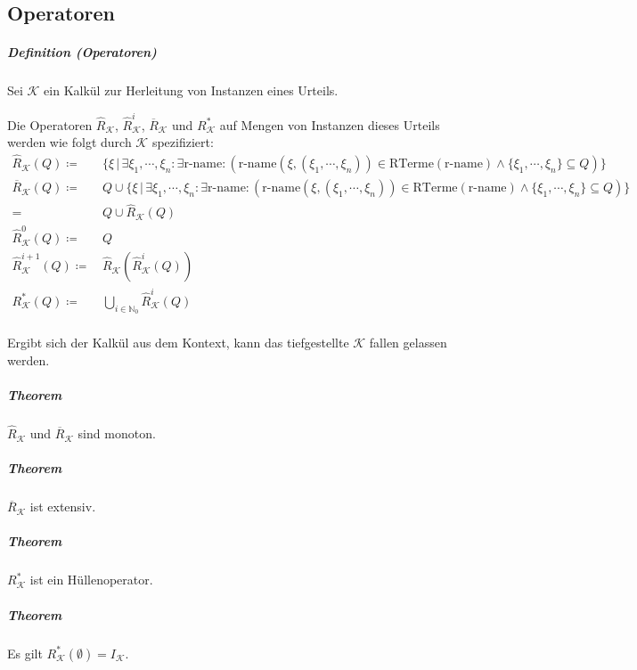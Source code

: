 \documentclass[a4paper, 11pt, accentcolor = tud3b]{tudreport}
\newcommand{\forwhich}{\ensuremath{{\,\vert\,}}}
\newcommand{\definition}[2]{\subparagraph{Definition (#1)} #2}
\newcommand{\theorem}[1]{\subparagraph{Theorem} #1}
\begin{document}
		    \subsection{Operatoren}
			    \definition{Operatoren}{
			    	Sei $ \mathcal{K} $ ein Kalkül zur Herleitung von Instanzen eines Urteils.
			    	
			    	Die Operatoren $ \hat{R} _ \mathcal{K} $, $ \hat{R} _ \mathcal{K} ^ i $, $ \overline{R} _ \mathcal{K} $ und $ R _ \mathcal{K} ^ * $ auf Mengen von Instanzen dieses Urteils werden wie folgt durch $ \mathcal{K} $ spezifiziert:
			    	\begin{align*}
				    	\hat{R} _ \mathcal{K} (Q) \coloneqq&\, \{ \xi \forwhich \exists \xi _ 1, \cdots, \xi _ n : \exists \text{r-name} : (\text{r-name}(\xi, (\xi _ 1, \cdots, \xi _ n)) \in \text{RTerme}(\text{r-name}) \land \{ \xi _ 1, \cdots, \xi _ n \} \subseteq Q) \} \\
				    	\overline{R} _ \mathcal{K} (Q) \coloneqq&\, Q \cup \{ \xi \forwhich \exists \xi _ 1, \cdots, \xi _ n : \exists \text{r-name} : (\text{r-name}(\xi, (\xi _ 1, \cdots, \xi _ n)) \in \text{RTerme}(\text{r-name}) \land \{ \xi _ 1, \cdots, \xi _ n \} \subseteq Q) \} \\
				    	=&\, Q \cup \hat{R} _ \mathcal{K} (Q) \\
				    	\hat{R} _ \mathcal{K} ^ 0 (Q) \coloneqq&\, Q \\
				    	\hat{R} _ \mathcal{K} ^ {i + 1} (Q) \coloneqq&\, \hat{R} _ \mathcal{K}(\hat{R} _ \mathcal{K} ^ i (Q)) \\
				    	R _ \mathcal{K} ^ * (Q) \coloneqq&\, \bigcup _ { i \in \mathbb{N} _ 0 } \hat{R} _ \mathcal{K} ^ i (Q) \\
			    	\end{align*}
			    	
			    	Ergibt sich der Kalkül aus dem Kontext, kann das tiefgestellte $ \mathcal{K} $ fallen gelassen werden.
			    }
		    
			    \theorem{$ \hat{R} _ \mathcal{K} $ und $ \overline{R} _ \mathcal{K} $ sind monoton.}
			    
			    \theorem{$ \overline{R} _ \mathcal{K} $ ist extensiv.}
		    
			    \theorem{$ R _ \mathcal{K} ^ * $ ist ein Hüllenoperator.}
			    
			    \theorem{Es gilt $ R _ \mathcal{K} ^ * (\emptyset) = I _ \mathcal{K} $.}
		    
\end{document}
